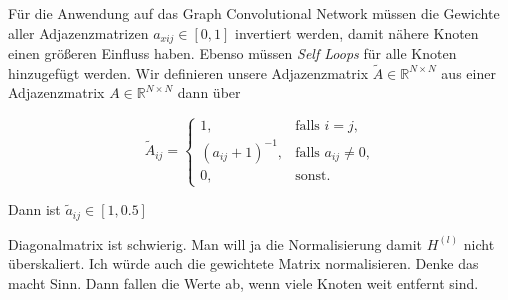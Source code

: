 Für die Anwendung auf das Graph Convolutional Network müssen die Gewichte aller Adjazenzmatrizen $a_{xij} \in [0, 1]$ invertiert werden, damit nähere Knoten einen größeren Einfluss haben.
Ebenso müssen \emph{Self Loops} für alle Knoten hinzugefügt werden.
Wir definieren unsere Adjazenzmatrix $\tilde A \in \mathbb{R}^{N \times N}$ aus einer Adjazenzmatrix $A \in \mathbb{R}^{N \times N}$ dann über

\begin{equation}
  \tilde A_{ij} = \begin{cases}
    1, & \text{falls }i=j\text{,}\\
    {(a_{ij}+1)}^{-1}, & \text{falls }a_{ij} \neq 0\text{,}\\
    0, & \text{sonst.}
  \end{cases}
\end{equation}

Dann ist $\tilde a_{ij} \in [1, 0.5]$

Diagonalmatrix ist schwierig.
Man will ja die Normalisierung damit $H^{(l)}$ nicht überskaliert.
Ich würde auch die gewichtete Matrix normalisieren.
Denke das macht Sinn.
Dann fallen die Werte ab, wenn viele Knoten weit entfernt sind.
